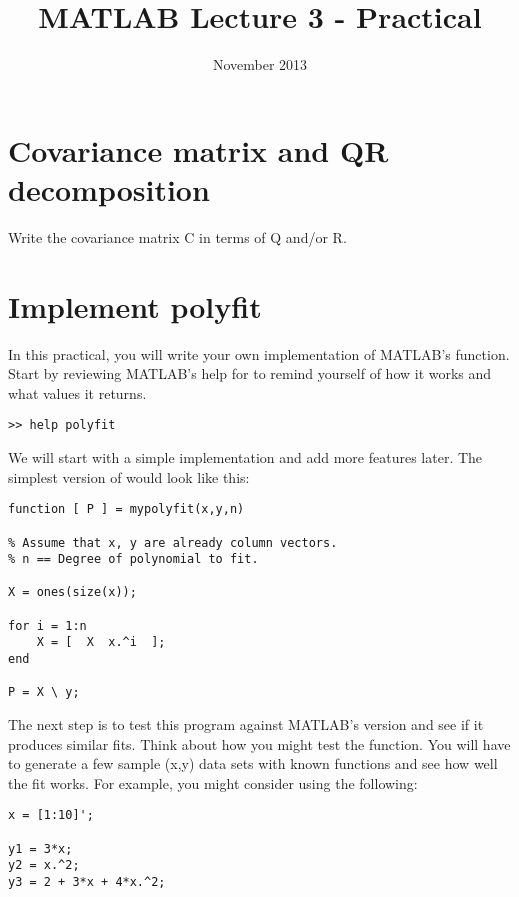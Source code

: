 
\title{MATLAB Lecture 3 - Practical}
\date{November 2013}


\maketitle

\section{Covariance matrix and QR decomposition}

Write the covariance matrix C in terms of Q and/or R.

\section{Implement polyfit}

In this practical, you will write your own implementation of MATLAB's
 function. Start by reviewing MATLAB's help for 
to remind yourself of how it works and what values it returns.

\begin{verbatim}
>> help polyfit
\end{verbatim}


We will start with a simple implementation and add more features later.
The simplest version of  would look like this:

\begin{verbatim}
function [ P ] = mypolyfit(x,y,n)

% Assume that x, y are already column vectors.
% n == Degree of polynomial to fit.

X = ones(size(x));

for i = 1:n
    X = [  X  x.^i  ];
end

P = X \ y;
\end{verbatim}

The next step is to test this program against MATLAB's version and see if
it produces similar fits. Think about how you might test the function.
You will have to generate a few sample (x,y) data sets with known functions
and see how well the fit works. For example, you might consider using the
following:

\begin{verbatim}
x = [1:10]';

y1 = 3*x;
y2 = x.^2;
y3 = 2 + 3*x + 4*x.^2;
\end{verbatim}

